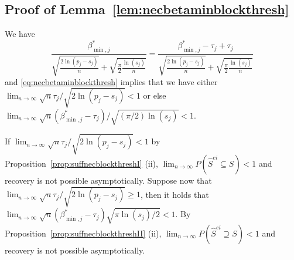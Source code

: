 \documentclass[
  12pt]{article}
\begin{document}
\subsection{Proof of Lemma~\ref{lem:necbetaminblockthresh}}
    We have $$\frac{\beta_{\min,j}^*}{\sqrt{\tfrac{2\ln(p_j-s_j)}{n}}+\sqrt{\tfrac{\pi}{2}\tfrac{\ln(s_j)}{n}}}= \frac{\beta_{\min,j}^*-\tau_j+\tau_j}{\sqrt{\tfrac{2\ln(p_j-s_j)}{n}}+\sqrt{\tfrac{\pi}{2}\tfrac{\ln(s_j)}{n}}}$$ and \eqref{eq:necbetaminblockthresh} implies that we have either $\lim_{n\to \infty}\sqrt{n}\tau_j/\sqrt{2\ln(p_j-s_j)} <1$ or else $\lim_{n\to \infty}\sqrt{n}(\beta_{\min,j}^*-\tau_j)/\sqrt{(\pi/2)\ln(s_j)} <1$. 
    
    If $\lim_{n\to \infty}\sqrt{n}\tau_j/\sqrt{2\ln(p_j-s_j)} <1$ by Proposition~\ref{prop:suffnecblockthreshI} (ii), $\lim_{n \to \infty} P(\hat{S}^{ei} \subseteq S) < 1$ and recovery is not possible asymptotically. 
    Suppose now that $\lim_{n\to \infty}\sqrt{n}\tau_j/\sqrt{2\ln(p_j-s_j)} \geq 1$, then it holds that $\lim_{n\to \infty}\sqrt{n}(\beta_{\min,j}^*-\tau_j)\sqrt{\pi\ln(s_j)/2} <1$. By Proposition~\ref{prop:suffnecblockthreshII} (ii), $\lim_{n \to \infty} P(\hat{S}^{ei} \supseteq S ) < 1$ and recovery is not possible asymptotically.
\end{document}
